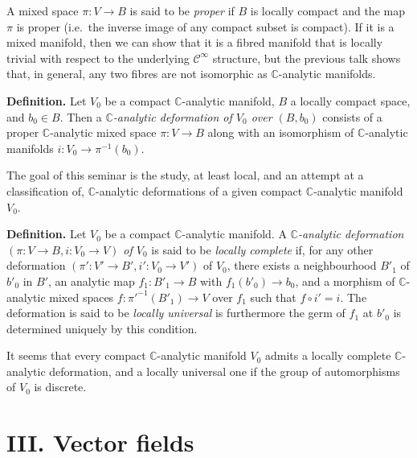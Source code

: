 \documentclass[british]{article}
\newenvironment{rmenv}[1]
  {\phantomsection\par\smallskip\noindent\textbf{#1.}\rmfamily}
  {\par\smallskip}
\newcommand{\oldpage}[1]{\marginpar{\footnotesize$\Big\vert$ \textit{p.~#1}}}
\begin{document}
A mixed space \(\pi\colon V\to B\) is said to be \emph{proper} if \(B\)
is locally compact and the map \(\pi\) is proper (i.e.~the inverse image
of any compact subset is compact). If it is a mixed manifold, then we
can show that it is a fibred manifold that is locally trivial with
respect to the underlying \(\mathscr{C}^\infty\) structure, but the
previous talk shows that, in general, any two fibres are not isomorphic
as \(\mathbb{C}\)-analytic manifolds.

\begin{rmenv}{Definition}
Let \(V_0\) be a compact \(\mathbb{C}\)-analytic manifold, \(B\) a
locally compact space, and \(b_0\in B\). \oldpage{2-04} Then a
\emph{\(\mathbb{C}\)-analytic deformation of \(V_0\) over \((B,b_0)\)}
consists of a proper \(\mathbb{C}\)-analytic mixed space
\(\pi\colon V\to B\) along with an isomorphism of
\(\mathbb{C}\)-analytic manifolds \(i\colon V_0\to\pi^{-1}(b_0)\).

\end{rmenv}

The goal of this seminar is the study, at least local, and an attempt at
a classification of, \(\mathbb{C}\)-analytic deformations of a given
compact \(\mathbb{C}\)-analytic manifold \(V_0\).

\begin{rmenv}{Definition}
Let \(V_0\) be a compact \(\mathbb{C}\)-analytic manifold. A
\emph{\(\mathbb{C}\)-analytic deformation
\((\pi\colon V\to B,i\colon V_0\to V)\) of \(V_0\)} is said to be
\emph{locally complete} if, for any other deformation
\((\pi'\colon V'\to B',i'\colon V_0\to V')\) of \(V_0\), there exists a
neighbourhood \(B'_1\) of \(b'_0\) in \(B'\), an analytic map
\(f_1\colon B'_1\to B\) with \(f_1(b'_0)\to b_0\), and a morphism of
\(\mathbb{C}\)-analytic mixed spaces \(f\colon {\pi'}^{-1}(B'_1)\to V\)
over \(f_1\) such that \(f\circ i'=i\). The deformation is said to be
\emph{locally universal} is furthermore the germ of \(f_1\) at \(b'_0\)
is determined uniquely by this condition.

\end{rmenv}

It seems that every compact \(\mathbb{C}\)-analytic manifold \(V_0\)
admits a locally complete \(\mathbb{C}\)-analytic deformation, and a
locally universal one if the group of automorphisms of \(V_0\) is
discrete.

\section*{III. Vector fields}\label{two-section-III}
\end{document}
